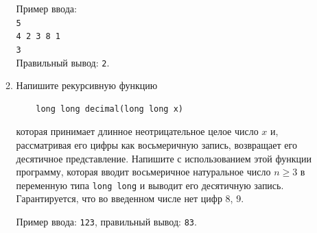 \documentclass{article}
\newcommand{\textex}[1]{\texttt{\color{ForestGreen}#1}}
\begin{document}
\begin{enumerate}[label={}, leftmargin=0pt, itemindent=0pt]
\begin{enumerate}[label=\arabic{enumi}.\arabic*.]
\noindent Пример ввода: \\
\textex{5\\4 2 3 8 1\\3}
\\
Правильный вывод: \textex{2}.

\item
Напишите рекурсивную функцию 
\begin{verbatim}
    long long decimal(long long x)
\end{verbatim}
которая принимает длинное неотрицательное целое число $x$ и, рассматривая его цифры как восьмеричную запись, возвращает его десятичное представление. Напишите с использованием этой функции программу, которая вводит восьмеричное натуральное число $n\geqslant 3$ в переменную типа \texttt{long long} и выводит его десятичную запись. Гарантируется, что во введенном числе нет цифр 8, 9.

\noindent Пример ввода: \textex{123}, правильный вывод: \textex{83}.
\end{enumerate}

\end{enumerate}
\end{document}
